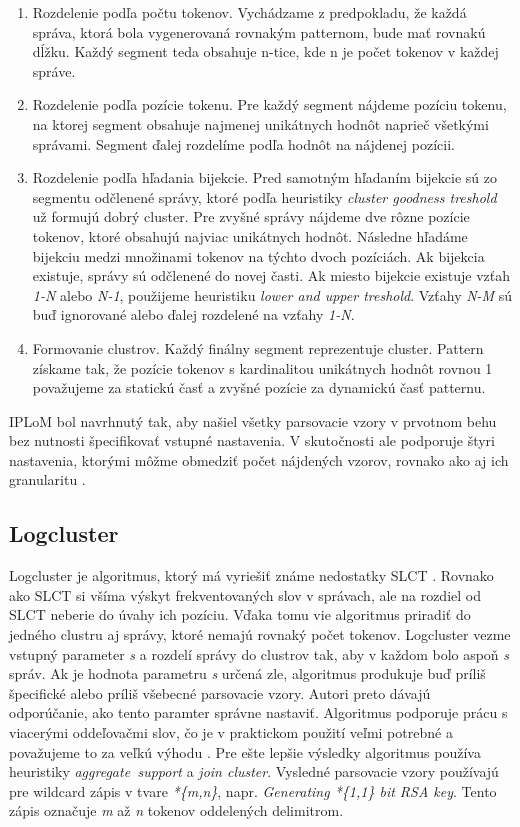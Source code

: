 \begin{enumerate}
  \item Rozdelenie podľa počtu tokenov. Vychádzame z predpokladu, že každá správa, ktorá bola vygenerovaná rovnakým patternom, bude mať rovnakú dĺžku. Každý segment teda obsahuje n-tice, kde n je počet tokenov v každej správe.
  \item Rozdelenie podľa pozície tokenu. Pre každý segment nájdeme pozíciu tokenu, na ktorej segment obsahuje najmenej unikátnych hodnôt naprieč všetkými správami. Segment ďalej rozdelíme podľa hodnôt na nájdenej pozícii.
  \item Rozdelenie podľa hľadania bijekcie. Pred samotným hľadaním bijekcie sú zo segmentu odčlenené správy, ktoré podľa heuristiky \emph{cluster goodness treshold} už formujú dobrý cluster. Pre zvyšné správy nájdeme dve rôzne pozície tokenov, ktoré obsahujú najviac unikátnych hodnôt. Následne hľadáme bijekciu medzi množinami tokenov na týchto dvoch pozíciách. Ak bijekcia existuje, správy sú odčlenené do novej časti. Ak miesto bijekcie existuje vzťah \emph{1-N} alebo \emph{N-1}, použijeme heuristiku \emph{lower and upper treshold}. Vzťahy \emph{N-M} sú buď ignorované alebo ďalej rozdelené na vzťahy \emph{1-N}.
  \item Formovanie clustrov. Každý finálny segment reprezentuje cluster. Pattern získame tak, že pozície tokenov s kardinalitou unikátnych hodnôt rovnou 1 považujeme za statickú časť a zvyšné pozície za dynamickú časť patternu.
\end{enumerate}

IPLoM bol navrhnutý tak, aby našiel všetky parsovacie vzory v prvotnom behu bez nutnosti špecifikovať vstupné nastavenia. V skutočnosti ale podporuje štyri nastavenia, ktorými môžme obmedziť počet nájdených vzorov, rovnako ako aj ich granularitu \parencite{nagappanvouk}.

\subsection{Logcluster}

Logcluster je algoritmus, ktorý má vyriešiť známe nedostatky SLCT \parencite{logcluster}. Rovnako ako SLCT si všíma výskyt frekventovaných slov v správach, ale na rozdiel od SLCT neberie do úvahy ich pozíciu. Vďaka tomu vie algoritmus priradiť do jedného clustru aj správy, ktoré nemajú rovnaký počet tokenov. Logcluster vezme vstupný parameter \emph{s} a rozdelí správy do clustrov tak, aby v každom bolo aspoň \emph{s} správ. Ak je hodnota parametru \emph{s} určená zle, algoritmus produkuje buď príliš špecifické alebo príliš všebecné parsovacie vzory. Autori preto dávajú odporúčanie, ako tento paramter správne nastaviť. Algoritmus podporuje prácu s viacerými oddeľovačmi slov, čo je v praktickom použití veľmi potrebné a považujeme to za veľkú výhodu \parencite{logclustertool}. Pre ešte lepšie výsledky algoritmus používa heuristiky \emph{aggregate\, support} a \emph{join cluster}. Vysledné parsovacie vzory používajú pre wildcard zápis v tvare \emph{*\{m,n\}}, napr. \emph{Generating *\{1,1\} bit RSA key}. Tento zápis označuje \emph{m} až \emph{n} tokenov oddelených delimitrom.


